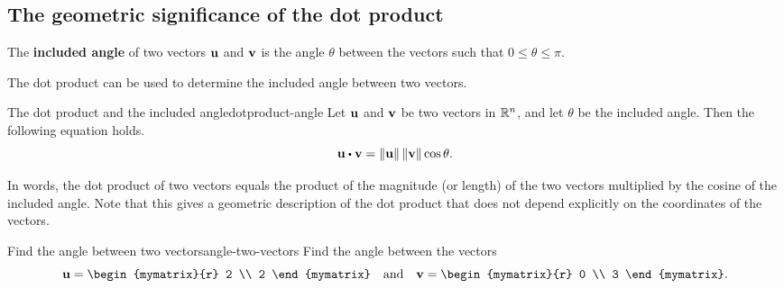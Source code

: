 \subsection{The geometric significance of the dot product}

The \textbf{included angle} of two vectors
$\mbox{\bf u}$ and $\mbox{\bf v}$ is the angle $\theta$ between the vectors
such that $0 \leq \theta \leq \pi$.
\begin{center}
\end{center}
The dot product can be used to determine the included angle between
two vectors.

\begin{proposition}{The dot product and the included angle}{dotproduct-angle}
  Let $\mbox{\bf u}$ and $\mbox{\bf v}$ be two vectors in $\mathbb{R}^n$, and let
  $\theta$ be the included angle. Then the following equation holds.
  \begin{equation*}
    \vect{u}\dotprod \vect{v}=\norm{\vect{u}} \norm{\vect{v}} \cos \theta.
  \end{equation*}
\end{proposition}

In words, the dot product of two vectors equals the product of the
magnitude (or length) of the two vectors multiplied by the cosine of
the included angle. Note that this gives a geometric description of
the dot product that does not depend explicitly on the coordinates of
the vectors.

\begin{example}{Find the angle between two vectors}{angle-two-vectors}
Find the angle between the vectors
\begin{equation*}
  \vect{u}
  =
  \begin{mymatrix}{r}
    2 \\
    2
  \end{mymatrix}
  \quad\mbox{and}\quad
  \vect{v}
  =
  \begin{mymatrix}{r}
    0 \\
    3
  \end{mymatrix}.
\end{equation*}
\end{example}

